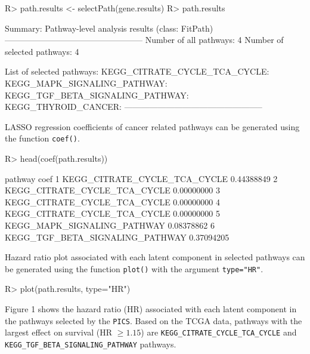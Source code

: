 \documentclass[11pt]{article}
\begin{document}
\begin{Schunk}
\begin{Sinput}
R> path.results <- selectPath(gene.results)
R> path.results
\end{Sinput}
\begin{Soutput}
Summary: Pathway-level analysis results (class: FitPath)
--------------------------------------------------
Number of all pathways: 4
Number of selected pathways: 4

List of selected pathways:
	KEGG_CITRATE_CYCLE_TCA_CYCLE:
	KEGG_MAPK_SIGNALING_PATHWAY:
	KEGG_TGF_BETA_SIGNALING_PATHWAY:
	KEGG_THYROID_CANCER:
--------------------------------------------------
\end{Soutput}
\end{Schunk}

LASSO regression coefficients of cancer related pathways can be generated using the function \texttt{coef()}.

\begin{Schunk}
\begin{Sinput}
R> head(coef(path.results))
\end{Sinput}
\begin{Soutput}
                          pathway       coef
1    KEGG_CITRATE_CYCLE_TCA_CYCLE 0.44388849
2    KEGG_CITRATE_CYCLE_TCA_CYCLE 0.00000000
3    KEGG_CITRATE_CYCLE_TCA_CYCLE 0.00000000
4    KEGG_CITRATE_CYCLE_TCA_CYCLE 0.00000000
5     KEGG_MAPK_SIGNALING_PATHWAY 0.08378862
6 KEGG_TGF_BETA_SIGNALING_PATHWAY 0.37094205
\end{Soutput}
\end{Schunk}

Hazard ratio plot associated with each latent component in selected pathways can be generated using the function \texttt{plot()} with the argument \texttt{type="{}HR"{}}.

\begin{Schunk}
\begin{Sinput}
R> plot(path.results, type="HR")
\end{Sinput}
\end{Schunk}

Figure 1 shows the hazard ratio (HR) associated with each latent component in the pathways selected by the \texttt{PICS}.
Based on the TCGA data, pathways with the largest effect on survival (HR $\geq 1.15$) are \texttt{KEGG\_CITRATE\_CYCLE\_TCA\_CYCLE} and \texttt{KEGG\_TGF\_BETA\_SIGNALING\_PATHWAY} pathways.
\end{document}

